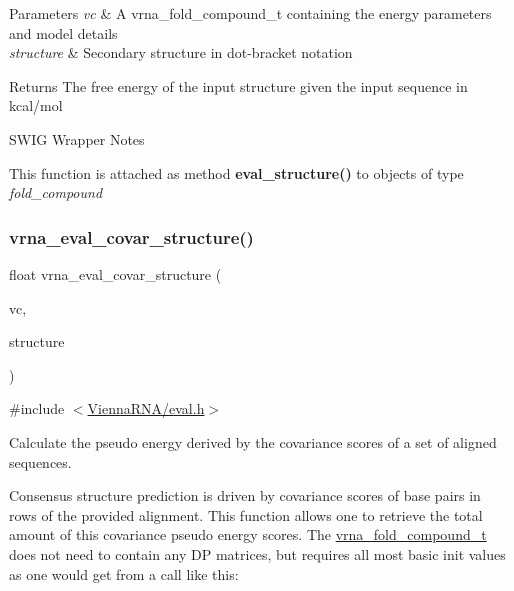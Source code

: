 \begin{DoxyParams}{Parameters}
{\em vc} & A vrna\+\_\+fold\+\_\+compound\+\_\+t containing the energy parameters and model details \\
\hline
{\em structure} & Secondary structure in dot-\/bracket notation \\
\hline
\end{DoxyParams}
\begin{DoxyReturn}{Returns}
The free energy of the input structure given the input sequence in kcal/mol
\end{DoxyReturn}
\begin{DoxyRefDesc}{S\+W\+I\+G Wrapper Notes}
\item[\mbox{\hyperlink{wrappers__wrappers000043}{S\+W\+I\+G Wrapper Notes}}]This function is attached as method {\bfseries{eval\+\_\+structure()}} to objects of type {\itshape fold\+\_\+compound} \end{DoxyRefDesc}
\mbox{\label{group__eval_ga6cea75c0eb9857fb59172be54cab09e0}} 
\subsubsection{\texorpdfstring{vrna\_eval\_covar\_structure()}{vrna\_eval\_covar\_structure()}}
{\footnotesize\ttfamily float vrna\+\_\+eval\+\_\+covar\+\_\+structure (\begin{DoxyParamCaption}\item[{\mbox{\hyperlink{group__fold__compound_ga1b0cef17fd40466cef5968eaeeff6166}{vrna\+\_\+fold\+\_\+compound\+\_\+t}} $\ast$}]{vc,  }\item[{const char $\ast$}]{structure }\end{DoxyParamCaption})}



{\ttfamily \#include $<$\mbox{\hyperlink{eval_8h}{Vienna\+R\+N\+A/eval.\+h}}$>$}



Calculate the pseudo energy derived by the covariance scores of a set of aligned sequences. 

Consensus structure prediction is driven by covariance scores of base pairs in rows of the provided alignment. This function allows one to retrieve the total amount of this covariance pseudo energy scores. The \mbox{\hyperlink{group__fold__compound_ga1b0cef17fd40466cef5968eaeeff6166}{vrna\+\_\+fold\+\_\+compound\+\_\+t}} does not need to contain any DP matrices, but requires all most basic init values as one would get from a call like this\+: 
\begin{DoxyCode}{0}
\end{DoxyCode}


